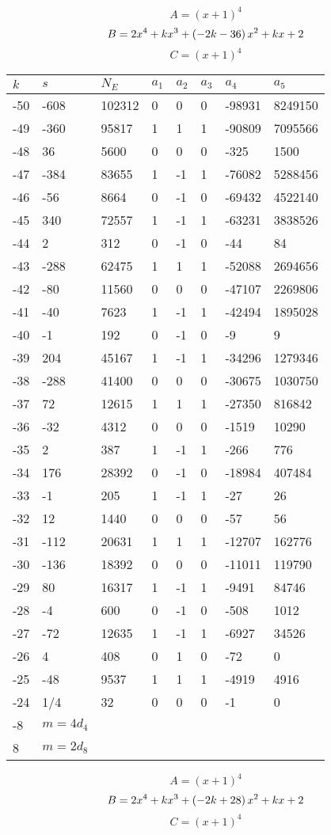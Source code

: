 \documentclass{amsart}
\begin{document}
$$A=(x
 + 1)^{4}$$
$$B=2\*x^4
 + k\*x^3
 + \left(-2\*k
 - 36\right) \*x^2
 + k\*x
 + 2$$
$$C=(x
 + 1)^{4}$$
\begin{longtable}{|l|l|l|lllll|}
\hline
$k$ & $s$ & $N_E$ & $a_1$ & $a_2$ & $a_3$ & $a_4$ & $a_5$\\
\hline
-50&-608&102312&0&0&0&-98931&8249150\\
-49&-360&95817&1&1&1&-90809&7095566\\
-48&36&5600&0&0&0&-325&1500\\
-47&-384&83655&1&-1&1&-76082&5288456\\
-46&-56&8664&0&-1&0&-69432&4522140\\
-45&340&72557&1&-1&1&-63231&3838526\\
-44&2&312&0&-1&0&-44&84\\
-43&-288&62475&1&1&1&-52088&2694656\\
-42&-80&11560&0&0&0&-47107&2269806\\
-41&-40&7623&1&-1&1&-42494&1895028\\
-40&-1&192&0&-1&0&-9&9\\
-39&204&45167&1&-1&1&-34296&1279346\\
-38&-288&41400&0&0&0&-30675&1030750\\
-37&72&12615&1&1&1&-27350&816842\\
-36&-32&4312&0&0&0&-1519&10290\\
-35&2&387&1&-1&1&-266&776\\
-34&176&28392&0&-1&0&-18984&407484\\
-33&-1&205&1&-1&1&-27&26\\
-32&12&1440&0&0&0&-57&56\\
-31&-112&20631&1&1&1&-12707&162776\\
-30&-136&18392&0&0&0&-11011&119790\\
-29&80&16317&1&-1&1&-9491&84746\\
-28&-4&600&0&-1&0&-508&1012\\
-27&-72&12635&1&-1&1&-6927&34526\\
-26&4&408&0&1&0&-72&0\\
-25&-48&9537&1&1&1&-4919&4916\\
-24&1/4&32&0&0&0&-1&0\\
-8&$m=4d_{4}$&&\multicolumn{5}{c|}{}\\
8&$m=2d_{8}$&&\multicolumn{5}{c|}{}\\
\hline
\end{longtable}
$$A=(x
 + 1)^{4}$$
$$B=2\*x^4
 + k\*x^3
 + \left(-2\*k
 + 28\right) \*x^2
 + k\*x
 + 2$$
$$C=(x
 + 1)^{4}$$
\end{document}
